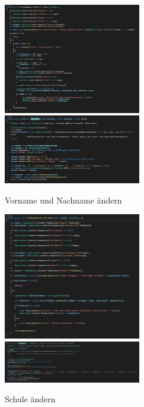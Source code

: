 \begin{figure}[h]
    \begin{center}
    \includegraphics[width=6cm]{pics/Xamarin Frontend/name1.png}\hfill
    \includegraphics[width=6cm]{pics/Xamarin Frontend/email2.png}
    \caption[MyAccount]{Vorname und Nachname ändern}
    \end{center}
\end{figure}
\begin{figure}[h]
    \begin{center}
    \includegraphics[width=6cm]{pics/Xamarin Frontend/school1.png}\hfill
    \includegraphics[width=6cm]{pics/Xamarin Frontend/school2.png}
    \caption[MyAccount]{Schule ändern}
    \end{center}
\end{figure}
